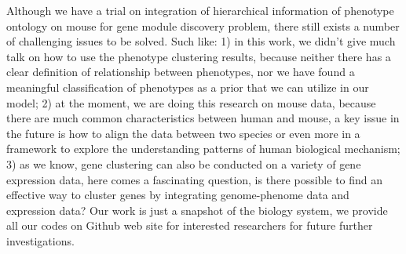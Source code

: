 \documentclass{bmcart}
\begin{document}
Although we have a trial on integration of hierarchical information of phenotype ontology on mouse for gene module discovery problem, there still exists a number of challenging issues to be solved. Such like: 1) in this work, we didn't give much talk on how to use the phenotype clustering results, because neither there has a clear definition of relationship between phenotypes, nor we have found a meaningful classification of phenotypes as a prior that we can utilize in our model; 2) at the moment, we are doing this research on mouse data, because there are much common characteristics between human and mouse, a key issue in the future is how to align the data between two species or even more in a framework to explore the understanding patterns of human biological mechanism; 3) as we know, gene clustering can also be conducted on a variety of gene expression data, here comes a fascinating question, is there possible to find an effective way to cluster genes by integrating genome-phenome data and expression data? Our work is just a snapshot of the biology system, we provide all our codes on Github web site for interested researchers for future further investigations.

\renewcommand{\enotesize}{\normalsize}
\theendnotes

\end{document}
